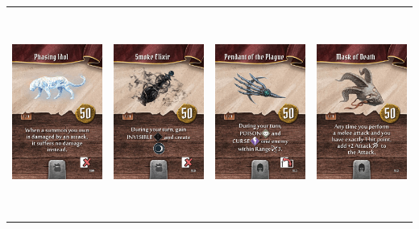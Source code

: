 \documentclass{minimal}
\begin{document}
{\begin{longtable}{llll}
\includegraphics[width=44mm,height=68mm]{./64-151/gh-142-phasing-idol.png} &
\includegraphics[width=44mm,height=68mm]{./64-151/gh-143-smoke-elixir.png} &
\includegraphics[width=44mm,height=68mm]{./64-151/gh-144-pendant-of-the-plague.png} &
\includegraphics[width=44mm,height=68mm]{./64-151/gh-145-mask-of-death.png}\\ 

\end{longtable}}
\end{document}
